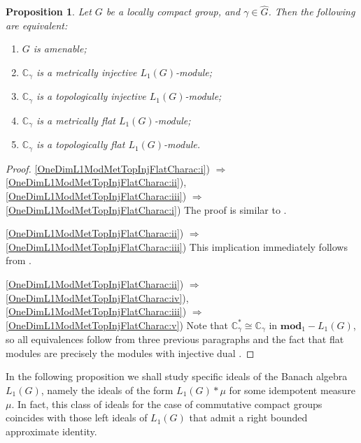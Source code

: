\documentclass{article}
\theoremstyle{plain}
\newtheorem{proposition}{Proposition}[section]
\theoremstyle{definition}
\newtheorem{proof}{Proof}\def\theproof{}
\newcommand{\convol}{\ast}
\newcommand{\isom}{\mathop{\mathbin{\cong}}}
\begin{document}
\begin{fulltext}
\begin{proposition}\label{OneDimL1ModMetTopInjFlatCharac} Let $G$ be a locally compact 
group, and $\gamma\in\widehat{G}$. Then the following are equivalent:
\begin{enumerate}
    \item $G$ is amenable;
    \label{OneDimL1ModMetTopInjFlatCharac:i}
    \item $\mathbb{C}_\gamma$ is a metrically injective $L_1(G)$-module;
    \label{OneDimL1ModMetTopInjFlatCharac:ii}
    \item $\mathbb{C}_\gamma$ is a topologically injective $L_1(G)$-module;
    \label{OneDimL1ModMetTopInjFlatCharac:iii}
    \item $\mathbb{C}_\gamma$ is a metrically flat $L_1(G)$-module;
    \label{OneDimL1ModMetTopInjFlatCharac:iv}
    \item $\mathbb{C}_\gamma$ is a topologically flat $L_1(G)$-module.
    \label{OneDimL1ModMetTopInjFlatCharac:v}
\end{enumerate}
\end{proposition}
\begin{proof} 
\ref{OneDimL1ModMetTopInjFlatCharac:i}) $\Longrightarrow$ \ref{OneDimL1ModMetTopInjFlatCharac:ii}), \ref{OneDimL1ModMetTopInjFlatCharac:iii}) $\Longrightarrow$ \ref{OneDimL1ModMetTopInjFlatCharac:i})
The proof is similar to \cite[theorem 4.5]{GravInjProjBanMod}.

\ref{OneDimL1ModMetTopInjFlatCharac:ii}) $\Longrightarrow$ \ref{OneDimL1ModMetTopInjFlatCharac:iii}) 
This implication immediately follows from 
\cite[proposition 2.14]{NemGeomProjInjFlatBanMod}.

\ref{OneDimL1ModMetTopInjFlatCharac:ii}) $\Longrightarrow$ \ref{OneDimL1ModMetTopInjFlatCharac:iv}),
\ref{OneDimL1ModMetTopInjFlatCharac:iii}) $\Longrightarrow$ \ref{OneDimL1ModMetTopInjFlatCharac:v}) 
Note that 
$\mathbb{C}_\gamma^*\isom \mathbb{C}_\gamma$ in $\mathbf{mod}_1-L_1(G)$, so all equivalences 
follow from three previous paragraphs and the fact that flat modules are precisely the 
modules with injective dual \cite[proposition 2.21]{NemGeomProjInjFlatBanMod}.
\end{proof}

In the following proposition we shall study specific ideals of the Banach algebra $L_1(G)$, 
namely the ideals of the form $L_1(G)\convol\mu$ for some idempotent measure $\mu$. In fact, 
this class of ideals for the case of commutative compact groups coincides with those left 
ideals of $L_1(G)$ that admit a right bounded approximate identity.


\end{fulltext}
\end{document}
